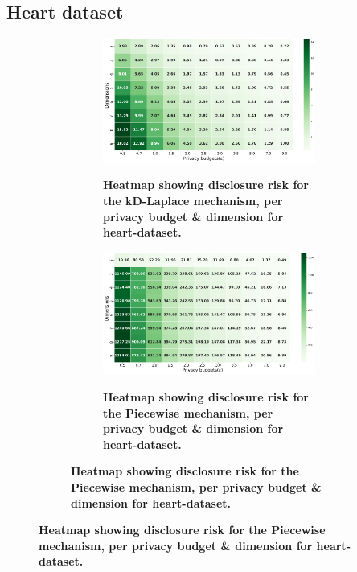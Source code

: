 \subsection{Heart dataset} \label{appendix:results-privacy-heart-dataset}
\begin{figure}[H]
    \centering
    \begin{subfigure}[b]{0.85\textwidth}
        \begin{subfigure}[c]{1\textwidth}
            \caption{\textbf{Heatmap showing disclosure risk for the kD-Laplace mechanism, per privacy budget \& dimension for heart-dataset.}}
            \includegraphics[width=1\textwidth]{Results/kd-laplace/kd-Laplace/heart-dataset/distance.png}
            \label{fig:privacy_risk_heart-dataset_adversial_advantage_kd-laplace}
        \end{subfigure}
        \vfill %

        \begin{subfigure}[c]{1\textwidth}
            \caption{\textbf{Heatmap showing disclosure risk for the Piecewise mechanism, per privacy budget \& dimension for heart-dataset.}}
            \includegraphics[width=1\textwidth]{Results/kd-laplace/piecewise/heart-dataset/distance.png}
            \label{fig:privacy_risk_heart-dataset_adversial_advantage_piecewise}
        \end{subfigure}
    \end{subfigure}
    \hfill %
\end{figure}
\newpage

